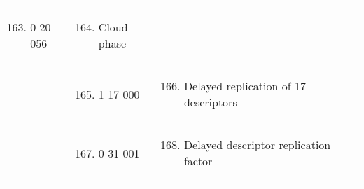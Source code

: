 \begin{longtable}[]{@{}llll@{}}
\begin{minipage}[t]{0.22\columnwidth}
\begin{enumerate}
\setcounter{enumi}{162}
\item
  0 20 056
\end{enumerate}\strut
\end{minipage} & \begin{minipage}[t]{0.22\columnwidth}\raggedright
\begin{enumerate}
\setcounter{enumi}{163}
\item
  Cloud phase
\end{enumerate}\strut
\end{minipage} & \begin{minipage}[t]{0.22\columnwidth}\raggedright
\strut
\end{minipage}\tabularnewline
\begin{minipage}[t]{0.22\columnwidth}\raggedright
\strut
\end{minipage} & \begin{minipage}[t]{0.22\columnwidth}\raggedright
\begin{enumerate}
\setcounter{enumi}{164}
\item
  1 17 000
\end{enumerate}\strut
\end{minipage} & \begin{minipage}[t]{0.22\columnwidth}\raggedright
\begin{enumerate}
\setcounter{enumi}{165}
\item
  Delayed replication of 17 descriptors
\end{enumerate}\strut
\end{minipage} & \begin{minipage}[t]{0.22\columnwidth}\raggedright
\strut
\end{minipage}\tabularnewline
\begin{minipage}[t]{0.22\columnwidth}\raggedright
\strut
\end{minipage} & \begin{minipage}[t]{0.22\columnwidth}\raggedright
\begin{enumerate}
\setcounter{enumi}{166}
\item
  0 31 001
\end{enumerate}\strut
\end{minipage} & \begin{minipage}[t]{0.22\columnwidth}\raggedright
\begin{enumerate}
\setcounter{enumi}{167}
\item
  Delayed descriptor replication factor
\end{enumerate}\strut

\end{minipage}
\end{longtable}
